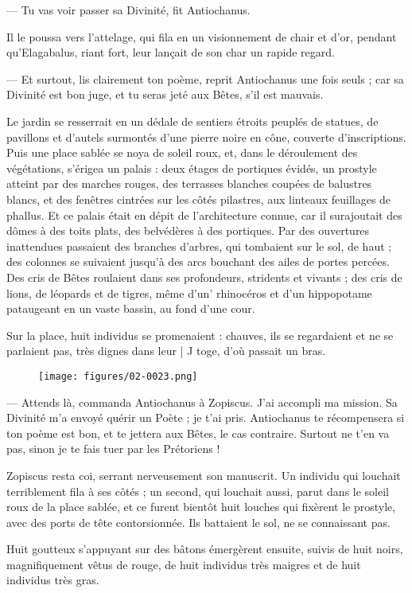 \documentclass[a4paper, 11pt, oneside, polutonikogreek, french]{article}
\begin{document}
--- Tu vas voir passer sa Divinité, fit Antiochanus.

Il le poussa vers l'attelage, qui fila en un visionnement de chair et d'or, pendant qu'Elagabalus, riant fort, leur lançait de son char un rapide regard.

--- Et surtout, lis clairement ton poème, reprit Antiochanus une fois seuls ; car sa Divinité est bon juge, et tu seras jeté aux Bêtes, s'il est mauvais.

Le jardin se resserrait en un dédale de sentiers étroits peuplés de statues, de pavillons et d'autels surmontés d'une pierre noire en cône, couverte d'inscriptions. Puis une place sablée se noya de soleil roux, et, dans le déroulement des végétations, s'érigea un palais : deux étages de portiques évidés, un prostyle atteint par des marches rouges, des terrasses blanches coupées de balustres blancs, et des fenêtres cintrées sur les côtés pilastres, aux linteaux feuillages de phallus. Et ce palais était en dépit de l'architecture connue, car il surajoutait des dômes à des toits plats, des belvédères à des portiques. Par des ouvertures inattendues passaient des branches d'arbres, qui tombaient sur le sol, de haut ; des colonnes se suivaient jusqu'à des arcs bouchant des ailes de portes percées. Des cris de Bêtes roulaient dans ses profondeurs, stridents et vivants ; des cris de lions, de léopards et de tigres, même d'un' rhinocéros et d'un hippopotame pataugeant en un vaste bassin, au fond d'une cour.

Sur la place, huit individus se promenaient : chauves, ils se regardaient et ne se parlaient pas, très dignes dans leur | J toge, d'où passait un bras.
\begin{figure}[H]
\centering
\texttt{[image: figures/02-0023.png]}
\end{figure}
--- Attends là, commanda Antiochanus à Zopiscus. J'ai accompli ma mission. Sa Divinité m'a envoyé quérir un Poète ; je t'ai pris. Antiochanus te récompensera si ton poème est bon, et te jettera aux Bêtes, le cas contraire. Surtout ne t'en va pas, sinon je te fais tuer par les Prétoriens !

Zopiscus resta coi, serrant nerveusement son manuscrit. Un individu qui louchait terriblement fila à ses côtés ; un second, qui louchait aussi, parut dans le soleil roux de la place sablée, et ce furent bientôt huit louches qui fixèrent le prostyle, avec des ports de tête contorsionnée. Ils battaient le sol, ne se connaissant pas.

Huit goutteux s'appuyant sur des bâtons émergèrent ensuite, suivis de huit noirs, magnifiquement vêtus de rouge, de huit individus très maigres et de huit individus très gras.
\end{document}
